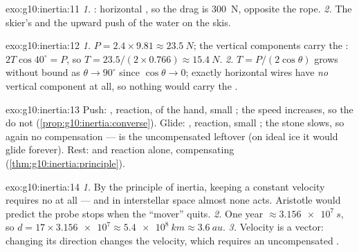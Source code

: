 \begin{solution}{exo:g10:inertia:11}
\emph{1.} : horizontal  , so the
drag is \qty{300}{N}, opposite the rope. \emph{2.} The skier's 
and the upward push of the water on the skis.
\end{solution}

\begin{solution}{exo:g10:inertia:12}
\emph{1.} $P = 2.4 \times 9.81 \approx \qty{23.5}{N}$; the vertical
components carry the : $2T\cos 40^\circ = P$, so
$T = 23.5/(2 \times 0.766) \approx \qty{15.4}{N}$. \emph{2.}
$T = P/(2\cos\theta)$ grows without bound as $\theta \to 90^\circ$
since $\cos\theta \to 0$; exactly horizontal wires have \emph{no}
vertical component at all, so nothing would carry the .
\end{solution}

\begin{solution}{exo:g10:inertia:13}
Push: , reaction,  of the hand, small ; the speed
increases, so the  do not 
(\cref{prop:g10:inertia:converse}). Glide: , reaction, small
; the stone slows, so again no compensation ---  is the
uncompensated leftover (on ideal ice it would glide forever). Rest:
 and reaction alone, compensating
(\cref{thm:g10:inertia:principle}).
\end{solution}

\begin{solution}{exo:g10:inertia:14}
\emph{1.} By the principle of inertia, keeping a constant velocity
requires no  at all --- and in interstellar space almost none
acts. Aristotle would predict the probe stops when the ``mover''
quits. \emph{2.} One year $\approx \qty{3.156e7}{s}$, so
$d = 17 \times \num{3.156e7} \approx \qty{5.4e8}{km} \approx
\qty{3.6}{au}$. \emph{3.} Velocity is a vector: changing its direction
changes the velocity, which requires an uncompensated .
\end{solution}


